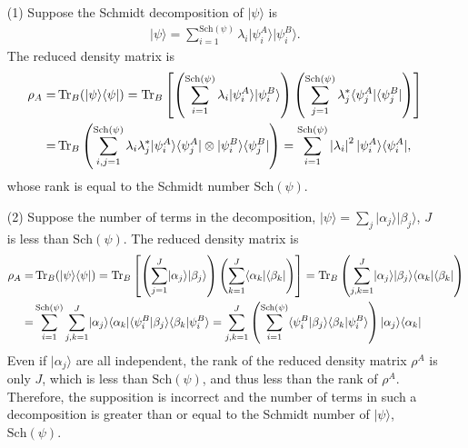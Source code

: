 \documentclass[en]{sol-man}
\begin{document}
\begin{pf}
    \begin{itemize}
        \item[(1)] Suppose the Schmidt decomposition of $\lvert\psi\rangle$ is
        \begin{align}
            \lvert\psi\rangle=\sum_{i=1}^{\text{Sch}(\psi)}\lambda_i\lvert\psi_i^A\rangle\lvert\psi_i^B\rangle.
        \end{align}
        The reduced density matrix is
        \begin{align}
            \notag\rho_A=&\operatorname{Tr}_B(\lvert\psi\rangle\langle\psi\rvert)=\operatorname{Tr}_B\left[\left(\sum_{i=1}^{\text{Sch}(\psi)}\lambda_i\lvert\psi_i^A\rangle\lvert\psi_i^B\rangle\right)\left(\sum_{j=1}^{\text{Sch}(\psi)}\lambda_j^*\langle\psi_j^A\rvert\langle\psi_j^B\rvert\right)\right]\\
            =&\operatorname{Tr}_B\left(\sum_{i,j=1}^{\text{Sch}(\psi)}\lambda_i\lambda_j^*\lvert\psi_i^A\rangle\langle\psi_j^A\rvert\otimes\lvert\psi_i^B\rangle\langle\psi_j^B\rvert\right)=\sum_{i=1}^{\text{Sch}(\psi)}\left\lvert\lambda_i\right\rvert^2\lvert\psi_i^A\rangle\langle\psi_i^A\rvert,
        \end{align}
        whose rank is equal to the Schmidt number $\text{Sch}(\psi)$.
        \item[(2)] Suppose the number of terms in the decomposition, $\lvert\psi\rangle=\sum_j\lvert\alpha_j\rangle\lvert\beta_j\rangle$, $J$ is less than $\text{Sch}(\psi)$.
        The reduced density matrix is
        \begin{align}
            \notag\rho_A=&\operatorname{Tr}_B(\lvert\psi\rangle\langle\psi\rvert)=\operatorname{Tr}_B\left[\left(\sum_{j=1}^J\lvert\alpha_j\rangle\lvert\beta_j\rangle\right)\left(\sum_{k=1}^J\langle\alpha_k\rvert\langle\beta_k\rvert\right)\right]=\operatorname{Tr}_B\left(\sum_{j,k=1}^J\lvert\alpha_j\rangle\lvert\beta_j\rangle\langle\alpha_k\rvert\langle\beta_k\rvert\right)\\
            =&\sum_{i=1}^{\text{Sch}(\psi)}\sum_{j,k=1}^J\lvert\alpha_j\rangle\langle\alpha_k\rvert\langle\psi_i^B\vert\beta_j\rangle\langle\beta_k\vert\psi_i^B\rangle=\sum_{j,k=1}^J\left(\sum_{i=1}^{\text{Sch}(\psi)}\langle\psi_i^B\vert\beta_j\rangle\langle\beta_k\vert\psi_i^B\rangle\right)\lvert\alpha_j\rangle\langle\alpha_k\rvert
        \end{align}
        Even if $\lvert\alpha_j\rangle$ are all independent, the rank of the reduced density matrix $\rho^A$ is only $J$, which is less than $\text{Sch}(\psi)$, and thus less than the rank of $\rho^A$.
        Therefore, the supposition is incorrect and the number of terms in such a decomposition is greater than or equal to the Schmidt number of $\lvert\psi\rangle$, $\text{Sch}(\psi)$.

\end{itemize}
\end{pf}
\end{document}

